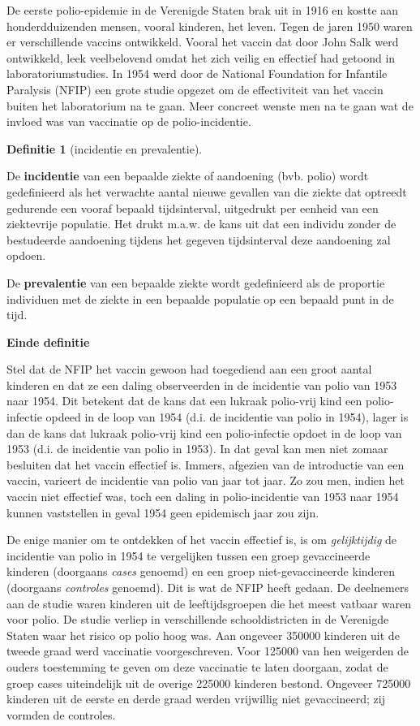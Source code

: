 \documentclass[
  12pt,dutch]{book}
\theoremstyle{definition}
\newtheorem{definition}{Definitie}[chapter]
\theoremstyle{definition}
\theoremstyle{definition}
\theoremstyle{definition}
\theoremstyle{remark}
\begin{document}
De eerste polio-epidemie in de Verenigde Staten brak uit in 1916 en kostte
aan honderdduizenden mensen, vooral kinderen, het leven. Tegen de jaren 1950
waren er verschillende vaccins ontwikkeld. Vooral het vaccin dat door John
Salk werd ontwikkeld, leek veelbelovend omdat het zich veilig en effectief
had getoond in laboratoriumstudies. In 1954 werd door de National Foundation
for Infantile Paralysis (NFIP) een grote studie opgezet om de effectiviteit
van het vaccin buiten het laboratorium na te gaan. Meer concreet wenste men
na te gaan wat de invloed was van vaccinatie op de polio-incidentie.

\begin{definition}[incidentie en prevalentie]
\protect\hypertarget{def:unnamed-chunk-65}{}\label{def:unnamed-chunk-65}~
\end{definition}

De \textbf{incidentie} van een bepaalde ziekte of aandoening (bvb. polio)
wordt gedefinieerd als het verwachte aantal nieuwe gevallen van die ziekte
dat optreedt gedurende een vooraf bepaald tijdsinterval, uitgedrukt per
eenheid van een ziektevrije populatie. Het drukt m.a.w. de kans uit dat een
individu zonder de bestudeerde aandoening tijdens het gegeven tijdsinterval
deze aandoening zal opdoen.

De \textbf{prevalentie} van een bepaalde ziekte wordt gedefinieerd als de
proportie individuen met de ziekte in een bepaalde populatie op een bepaald
punt in de tijd.

\textbf{Einde definitie}

Stel dat de NFIP het vaccin gewoon had toegediend aan een groot aantal
kinderen en dat ze een daling observeerden in de incidentie van polio van
1953 naar 1954. Dit betekent dat de kans dat een lukraak polio-vrij kind een
polio-infectie opdeed in de loop van 1954 (d.i. de incidentie van polio in
1954), lager is dan de kans dat lukraak polio-vrij kind een polio-infectie
opdoet in de loop van 1953 (d.i. de incidentie van polio in 1953). In dat
geval kan men niet zomaar besluiten dat het vaccin effectief is. Immers,
afgezien van de introductie van een vaccin, varieert de incidentie van polio
van jaar tot jaar. Zo zou men, indien het vaccin niet effectief was, toch
een daling in polio-incidentie van 1953 naar 1954 kunnen vaststellen in
geval 1954 geen epidemisch jaar zou zijn.

De enige manier om te ontdekken of het vaccin effectief is, is om \emph{gelijktijdig} de incidentie van polio in 1954 te vergelijken tussen een
groep gevaccineerde kinderen (doorgaans \emph{cases} genoemd) en een groep
niet-gevaccineerde kinderen (doorgaans \emph{controles} genoemd). Dit is
wat de NFIP heeft gedaan. De deelnemers aan de studie waren kinderen uit de
leeftijdsgroepen die het meest vatbaar waren voor polio. De studie verliep in
verschillende schooldistricten in de Verenigde Staten waar het risico op
polio hoog was. Aan ongeveer 350000 kinderen uit de tweede graad werd
vaccinatie voorgeschreven. Voor 125000 van hen weigerden de ouders
toestemming te geven om deze vaccinatie te laten doorgaan, zodat de groep
cases uiteindelijk uit de overige 225000 kinderen bestond. Ongeveer
725000 kinderen uit de eerste en derde graad werden vrijwillig niet
gevaccineerd; zij vormden de controles.
\end{document}
